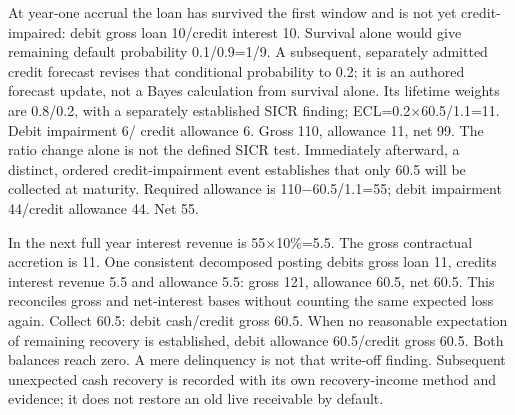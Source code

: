 At year-one accrual the loan has survived the first window and is not yet credit-impaired: debit gross loan 10/credit interest 10. Survival alone would give remaining default probability 0.1/0.9=1/9. A subsequent, separately admitted credit forecast revises that conditional probability to 0.2; it is an authored forecast update, not a Bayes calculation from survival alone. Its lifetime weights are 0.8/0.2, with a separately established SICR finding; ECL=0.2\ensuremath{\times}60.5/1.1=11. Debit impairment 6/ credit allowance 6. Gross 110, allowance 11, net 99. The ratio change alone is not the defined SICR test. Immediately afterward, a distinct, ordered credit-impairment event establishes that only 60.5 will be collected at maturity. Required allowance is 110\ensuremath{-}60.5/1.1=55; debit impairment 44/credit allowance 44. Net 55.

In the next full year interest revenue is 55\ensuremath{\times}10\%=5.5. The gross contractual accretion is 11. One consistent decomposed posting debits gross loan 11, credits interest revenue 5.5 and allowance 5.5: gross 121, allowance 60.5, net 60.5. This reconciles gross and net-interest bases without counting the same expected loss again. Collect 60.5: debit cash/credit gross 60.5. When no reasonable expectation of remaining recovery is established, debit allowance 60.5/credit gross 60.5. Both balances reach zero. A mere delinquency is not that write-off finding. Subsequent unexpected cash recovery is recorded with its own recovery-income method and evidence; it does not restore an old live receivable by default.

